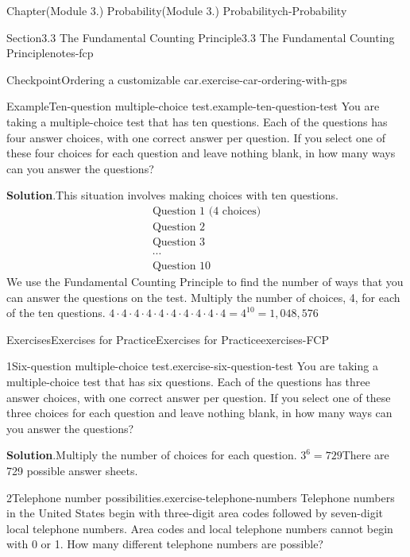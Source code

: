\documentclass[oneside,10pt,]{book}
\newcommand{\blocktitlefont}{\relax}
\begin{document}
\begin{chapterptx}{Chapter}{(Module 3.) Probability}{}{(Module 3.) Probability}{}{}{ch-Probability}
\begin{sectionptx}{Section}{3.3 The Fundamental Counting Principle}{}{3.3 The Fundamental Counting Principle}{}{}{notes-fcp}
\begin{inlineexercise}{Checkpoint}{Ordering a customizable car.}{exercise-car-ordering-with-gps}
\end{inlineexercise}%
\begin{example}{Example}{Ten-question multiple-choice test.}{example-ten-question-test}%
You are taking a multiple-choice test that has ten questions. Each of the questions has four answer choices, with one correct answer per question. If you select one of these four choices for each question and leave nothing blank, in how many ways can you answer the questions?%
\par\smallskip%
\noindent\textbf{\blocktitlefont Solution}.\hypertarget{example-ten-question-test-3}{}\quad{}This situation involves making choices with ten questions.%
%
\begin{gather*}
\text{Question 1 (4 choices)}\\
\text{Question 2}\\
\text{Question 3}\\
\cdots\\
\text{Question 10}
\end{gather*}
We use the Fundamental Counting Principle to find the number of ways that you can answer the questions on the test. Multiply the number of choices, 4, for each of the ten questions.%
\(4 \cdot 4 \cdot 4 \cdot 4 \cdot 4 \cdot 4 \cdot 4 \cdot 4 \cdot 4 \cdot 4 = 4^{10} = 1,048,576\)\end{example}
%
%
\typeout{************************************************}
\typeout{************************************************}
%
\begin{exercises-subsection-numberless}{Exercises}{Exercises for Practice}{}{Exercises for Practice}{}{}{exercises-FCP}
\begin{divisionexercise}{1}{Six-question multiple-choice test.}{}{exercise-six-question-test}%
You are taking a multiple-choice test that has six questions. Each of the questions has three answer choices, with one correct answer per question. If you select one of these three choices for each question and leave nothing blank, in how many ways can you answer the questions?%
\par\smallskip%
\noindent\textbf{\blocktitlefont Solution}.\hypertarget{exercise-six-question-test-3}{}\quad{}Multiply the number of choices for each question.%
\(3^6 = 729\)There are 729 possible answer sheets.%
\end{divisionexercise}%
\begin{divisionexercise}{2}{Telephone number possibilities.}{}{exercise-telephone-numbers}%
Telephone numbers in the United States begin with three-digit area codes followed by seven-digit local telephone numbers. Area codes and local telephone numbers cannot begin with 0 or 1. How many different telephone numbers are possible?%

\end{divisionexercise}
\end{exercises-subsection-numberless}
\end{sectionptx}
\end{chapterptx}
\end{document}
